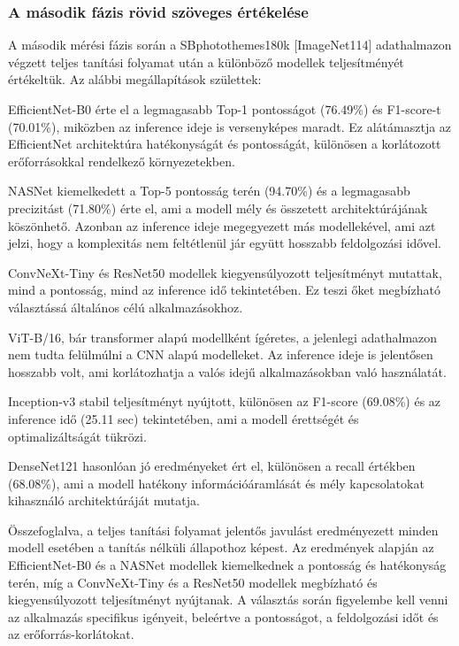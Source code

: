 \subsubsection{A második fázis rövid szöveges értékelése}
    A második mérési fázis során a SBphotothemes180k [ImageNet114] adathalmazon végzett teljes tanítási folyamat után a különböző modellek teljesítményét értékeltük. Az alábbi megállapítások születtek:

    EfficientNet-B0 érte el a legmagasabb Top-1 pontosságot (76.49\%) és F1-score-t (70.01\%), miközben az inference ideje is versenyképes maradt. Ez alátámasztja az EfficientNet architektúra hatékonyságát és pontosságát, különösen a korlátozott erőforrásokkal rendelkező környezetekben.

    NASNet kiemelkedett a Top-5 pontosság terén (94.70\%) és a legmagasabb precizitást (71.80\%) érte el, ami a modell mély és összetett architektúrájának köszönhető. Azonban az inference ideje megegyezett más modellekével, ami azt jelzi, hogy a komplexitás nem feltétlenül jár együtt hosszabb feldolgozási idővel.

    ConvNeXt-Tiny és ResNet50 modellek kiegyensúlyozott teljesítményt mutattak, mind a pontosság, mind az inference idő tekintetében. Ez teszi őket megbízható választássá általános célú alkalmazásokhoz.

    ViT-B/16, bár transformer alapú modellként ígéretes, a jelenlegi adathalmazon nem tudta felülmúlni a CNN alapú modelleket. Az inference ideje is jelentősen hosszabb volt, ami korlátozhatja a valós idejű alkalmazásokban való használatát.

    Inception-v3 stabil teljesítményt nyújtott, különösen az F1-score (69.08\%) és az inference idő (25.11 sec) tekintetében, ami a modell érettségét és optimalizáltságát tükrözi.

    DenseNet121 hasonlóan jó eredményeket ért el, különösen a recall értékben (68.08\%), ami a modell hatékony információáramlását és mély kapcsolatokat kihasználó architektúráját mutatja.

    Összefoglalva, a teljes tanítási folyamat jelentős javulást eredményezett minden modell esetében a tanítás nélküli állapothoz képest. Az eredmények alapján az EfficientNet-B0 és a NASNet modellek kiemelkednek a pontosság és hatékonyság terén, míg a ConvNeXt-Tiny és a ResNet50 modellek megbízható és kiegyensúlyozott teljesítményt nyújtanak. A választás során figyelembe kell venni az alkalmazás specifikus igényeit, beleértve a pontosságot, a feldolgozási időt és az erőforrás-korlátokat.
